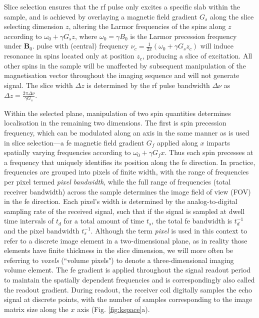 Slice selection ensures that the \gls{rf} pulse only excites a specific slab within the sample, and is achieved by overlaying a magnetic field gradient $G_s$ along the slice selecting dimension $z$, altering the Larmor frequencies of the spins along $z$ according to $\omega_0 + \gamma G_sz$, where $\omega_0 = \gamma B_0$ is the Larmor precession frequency under $\mathbf{B}_0$.
 pulse with (central) frequency $\nu_c = \frac{1}{2\pi} (\omega_0 + \gamma G_s z_c)$ will induce resonance in spins located only at position $z_c$, producing a slice of excitation. %
All other spins in the sample will be unaffected by subsequent manipulation of the magnetisation vector throughout the imaging sequence and will not generate signal.
The slice width $\Delta z$ is determined by the \gls{rf} pulse bandwidth $\Delta\nu$ as $\Delta z = \frac{2 \pi \Delta \nu}{\gamma G_s}$.

Within the selected plane, manipulation of two spin quantities determines localisation in the remaining two dimensions.
The first is spin precession frequency, which can be modulated along an axis in the same manner as is used in slice selection---a \gls{fe} magnetic field gradient $G_{f}$ applied along $x$ imparts spatially varying frequencies according to $\omega_0 + \gamma G_{f}x$.
Thus each spin precesses at a frequency that uniquely identifies its position along the \gls{fe} direction.
In practice, frequencies are grouped into pixels of finite width, with the range of frequencies per pixel termed \textit{pixel bandwidth}, while the full range of frequencies (total receiver bandwidth) across the sample determines the image field of view (FOV) in the \gls{fe} direction.
Each pixel's width is determined by the analog-to-digital sampling rate of the received signal, such that if the signal is sampled at dwell time intervals of $t_d$ for a total amount of time $t_s$, the total \gls{fe} bandwidth is $t_d^{-1}$ and the pixel bandwidth $t_s^{-1}$.
Although the term \textit{pixel} is used in this context to refer to a discrete image element in a two-dimensional plane, as in reality those elements have finite thickness in the slice dimension, we will more often be referring to \textit{voxels} (``volume pixels") to denote a three-dimensional imaging volume element.
The \gls{fe} gradient is applied throughout the signal readout period to maintain the spatially dependent frequencies and is correspondingly also called the readout gradient.
During readout, the receiver coil digitally samples the echo signal at discrete points, with the number of samples corresponding to the image matrix size along the $x$ axis (Fig. \ref{fig:kspace}a).

